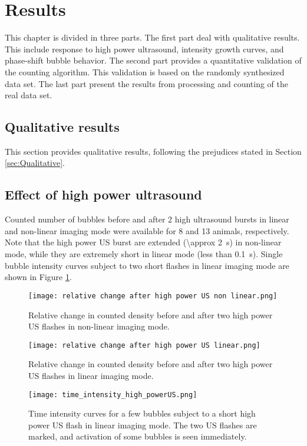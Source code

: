 \section{Results}
This chapter is divided in three parts. The first part deal with qualitative results. This include response to high power ultrasound, intensity growth curves, and phase-shift bubble behavior. The second part provides a quantitative validation of the counting algorithm. This validation is based on the randomly synthesized data set. The last part present the results from processing and counting of the real data set. 
 
\subsection{Qualitative results}
This section provides qualitative results, following the prejudices stated in Section \ref{sec:Qualitative}.
\subsection{Effect of high power ultrasound}

Counted number of bubbles before and after 2 high ultrasound bursts in linear and non-linear imaging mode were available for 8 and 13 animals, respectively. Note that the high power US burst are extended (\SI{\approx 2}{\second}) in non-linear mode, while they are extremely short in linear mode (less than \SI{0.1}{\second}). Single bubble intensity curves subject to two short flashes in linear imaging mode are shown in Figure \ref{Fig:high_power_US}. 
\begin{figure}
\centering
\begin{minipage}[t]{.45\textwidth}
\centering
\texttt{[image: relative change after high power US non linear.png]}
\caption{Relative change in counted density before and after two high power US flashes in non-linear imaging mode.}
\end{minipage}\hfill
\begin{minipage}[t]{.45\textwidth}
\centering
\texttt{[image: relative change after high power US linear.png]}
\caption{Relative change in counted density before and after two high power US flashes in linear imaging mode.}
\end{minipage}
\end{figure}

\begin{figure}[h]
  \centering
  \label{Fig:high_power_US}
  \texttt{[image: time\_intensity\_high\_powerUS.png]}
  \caption{Time intensity curves for a few bubbles subject to a short high power US flash in linear imaging mode. The two US flashes are marked, and activation of some bubbles is seen immediately.}
\end{figure}
 

